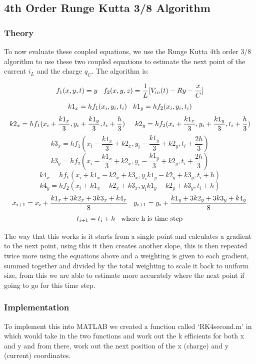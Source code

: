 \documentclass[11pt,a4paper]{article}
\begin{document}
\subsection{4th Order Runge Kutta 3/8 Algorithm}
\subsubsection{Theory}

To now evaluate these coupled equations, we use the Runge Kutta 4th order 3/8 algorithm to use these two coupled equations to estimate the next point of the current $i_L$ and the charge $q_C$. The algorithm is:

\[f_1(x,y,t) = y \hspace{3mm} f_2(x,y,z) = \frac{1}{L}[V_{in}(t) - Ry - \frac{x}{C}]\]
\[k1_x = hf_1(x_i,y_i,t_i) \hspace{3mm} k1_y = hf_2(x_i,y_i,t_i)\]
\[k2_x = hf_1(x_i+\frac{k1_x}{3},y_i+\frac{k1_y}{3},t_i+\frac{h}{3}) \hspace{5mm} k2_y = hf_2(x_i+\frac{k1_x}{3},y_i+\frac{k1_y}{3},t_i+\frac{h}{3})\]
\[k3_x = hf_1(x_i-\frac{k1_x}{3}+k2_x,y_i-\frac{k1_y}{3}+k2_y,t_i+\frac{2h}{3}) \]
\[k3_y = hf_2(x_i-\frac{k1_x}{3}+k2_x,y_i-\frac{k1_y}{3}+k2_y,t_i+\frac{2h}{3})\]
\[k4_x = hf_1(x_i+k1_x-k2_x+k3_x,y_ik1_y-k2_y+k3_y,t_i+h) \]
\[k4_y = hf_2(x_i+k1_x-k2_x+k3_x,y_ik1_y-k2_y+k3_y,t_i+h)\]
\[x_{i+1} =x_i+\frac{k1_x+3k2_x+3k3_x+k4_x}{8} \hspace{3mm} y_{i+1} =y_i+\frac{k1_y+3k2_y+3k3_y+k4_y}{8}\]
\[t_{i+1} = t_i + h \hspace{3mm} \text{where h is time step}\]

The way that this works is it starts from a single point and calculates a gradient to the next point, using this it then creates another slope, this is then repeated twice more using the equations above and a weighting is given to each gradient, summed together and divided by the total weighting to scale it back to uniform size, from this we are able to estimate more accurately where the next point if going to go for this time step.

\subsubsection{Implementation}

To implement this into MATLAB we created a function called `RK4second.m' in which would take in the two functions and work out the k efficients for both x and y and from there, work out the next position of the x (charge) and y (current) coordinates.
\end{document}

